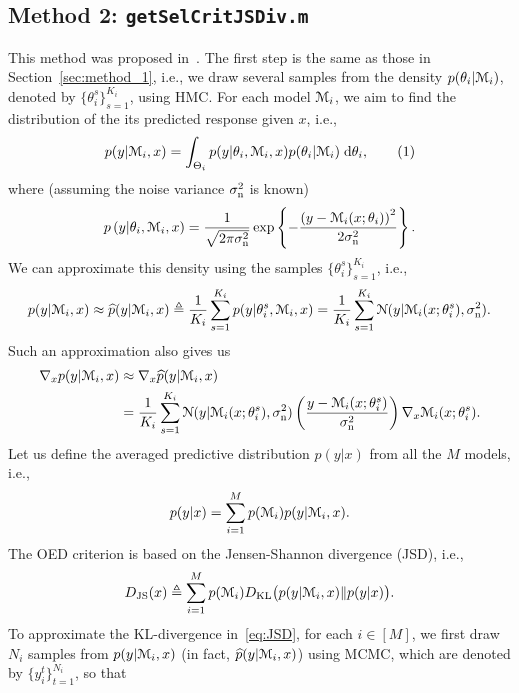 \documentclass[11pt]{article}
\numberwithin{equation}{section}
\begin{document}
\subsection{Method 2: {\tt getSelCritJSDiv.m}} \label{sec:JSDiv}
This method was proposed in~\cite{Van_14}. The first step is the same as those in Section~\ref{sec:method_1}, i.e., we draw several samples from the density $p(\theta_i|\mathcal{M}_i)$, denoted by $\{\theta_i^s\}_{s=1}^{K_i}$,  using HMC. For each model $\mathcal{M}_i$, we aim to find the distribution   of the its predicted response given $x$, i.e., 
\begin{equation*}
p(y|\calM_i,x)=\int_{\Theta_i} p(y|\theta_i,\calM_i,x)p(\theta_i|\calM_i)\;{\rm d} \theta_i,\nt\label{eq:pred_dist}
\end{equation*}
where (assuming the noise variance $\sigma_{\mathrm{n}}^2$ is known)
\begin{align*}
p\left(y|\theta_i,\mathcal{M}_i,x\right) = \frac{1}{\sqrt{2\pi\sigma_{\mathrm{n}}^2}}\exp\left\{ -\frac{\left(y-\mathcal{M}_i(x;\theta_i)\right)^2}{2\sigma_{\mathrm{n}}^2}\right\}. \label{eq:lik_model_theta}
\end{align*}
We can approximate this density using the samples $\{\theta_i^s\}_{s=1}^{K_i}$, i.e.,
\begin{equation}
p(y|\mathcal{M}_i,x)\approx \widehat{p}(y|\mathcal{M}_i,x)\triangleq \frac{1}{K_i}\sum_{s=1}^{K_i} p(y|\theta_i^s,\mathcal{M}_i,x) = \frac{1}{K_i}\sum_{s=1}^{K_i} \mathcal{N}(y|\mathcal{M}_i(x;\theta_i^s),\sigma_{\mathrm{n}}^2).\label{eq:approx_resp_dist}
\end{equation}
Such an approximation also gives us
\begin{align}
\nabla_x p(y|\mathcal{M}_i,x)&\approx \nabla_x \widehat{p}(y|\mathcal{M}_i,x)\nonumber\\
&=\frac{1}{K_i}\sum_{s=1}^{K_i} \mathcal{N}(y|\mathcal{M}_i(x;\theta_i^s),\sigma_{\mathrm{n}}^2)\left(\frac{y-\mathcal{M}_i(x;\theta_i^s)}{\sigma_{\mathrm{n}}^2}\right)\nabla_x \mathcal{M}_i(x;\theta_i^s).\label{eq:approx_resp_dist_grad}
\end{align}
Let us define the averaged predictive distribution $p(y|x)$ from all the $M$ models, i.e.,
\begin{equation}
p(y|x) = \sum_{i=1}^M p(\mathcal{M}_i)p(y|\mathcal{M}_i,x). \label{eq:ave_pred_dist}
\end{equation} 
The OED criterion is based on the Jensen-Shannon divergence (JSD), i.e.,  %
\begin{align}
D_{\rm JS}(x) \triangleq \sum_{i=1}^M p(\mathcal{M}_i) D_{\rm KL}\big(p(y|\mathcal{M}_i,x)\Vert p(y|x)\big).\label{eq:JSD}
\end{align}
To approximate the KL-divergence in~\eqref{eq:JSD}, for each $i\in[M]$, we first draw $N_i$ samples from $p(y|\mathcal{M}_i,x)$ (in fact, $\widehat{p}(y|\mathcal{M}_i,x)$) using MCMC, which are denoted by $\{y_i^t\}_{t=1}^{N_i}$, so that
\end{document}
